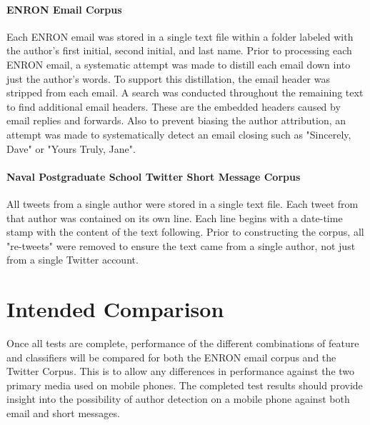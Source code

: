 	\paragraph{ENRON Email Corpus} Each ENRON email was stored in a single text file within a folder labeled with the author's first initial, second initial, and last name.  Prior to processing each ENRON email, a systematic attempt was made to distill each email down into just the author's words.  To support this distillation, the email header was stripped from each email.  A search was conducted throughout the remaining text to find additional email headers.  These are the embedded headers caused by email replies and forwards.  Also to prevent biasing the author attribution, an attempt was made to systematically detect an email closing such as "Sincerely, Dave" or "Yours Truly, Jane".
	\paragraph{Naval Postgraduate School Twitter Short Message Corpus} All tweets from a single author were stored in a single text file.  Each tweet from that author was contained on its own line.  Each line begins with a date-time stamp with the content of the text following.  Prior to constructing the corpus, all "re-tweets" were removed to ensure the text came from a single author, not just from a single Twitter account.
	
\section{Intended Comparison}  Once all tests are complete, performance of the different combinations of feature and classifiers will be compared for both the ENRON email corpus and the Twitter Corpus.  This is to allow any differences in performance against the two primary media used on mobile phones.  The completed test results should provide insight into the possibility of author detection on a mobile phone against both email and short messages.




